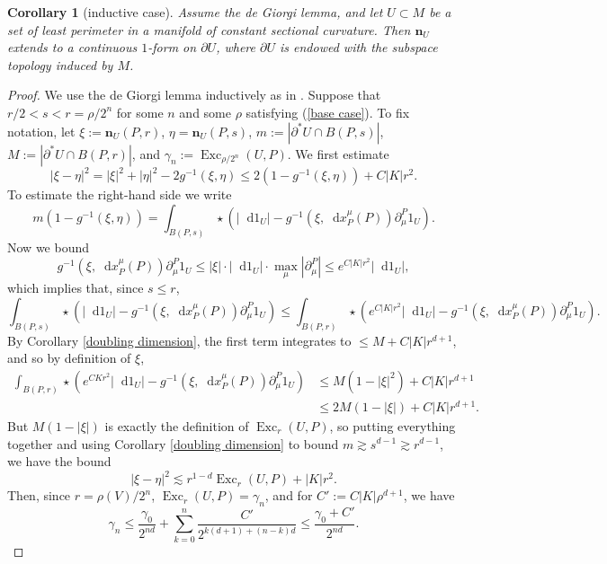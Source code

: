 \documentclass[reqno,11pt]{amsart}
\DeclareMathOperator{\Exc}{Exc}
\newcommand*\dif{\mathop{}\!\mathrm{d}}
\newcommand{\normal}{\mathbf n}
\newtheorem{corollary}[theorem]{Corollary}
\theoremstyle{definition}
\numberwithin{equation}{section}
\begin{document}
\begin{corollary}[inductive case]
Assume the de Giorgi lemma, and let $U \subset M$ be a set of least perimeter in a manifold of constant sectional curvature.
Then $\normal_U$ extends to a continuous $1$-form on $\partial U$, where $\partial U$ is endowed with the subspace topology induced by $M$.
\end{corollary}
\begin{proof}
We use the de Giorgi lemma inductively as in \cite[Theorem 8.2]{Giusti77}.
Suppose that $r/2 < s < r = \rho/2^n$ for some $n$ and some $\rho$ satisfying (\ref{base case}).
To fix notation, let
$\xi := \normal_U(P, r)$, $\eta = \normal_U(P, s)$, $m := |\partial^* U \cap B(P, s)|$, $M := |\partial^* U \cap B(P, r)|$, and $\gamma_n := \Exc_{\rho/2^n}(U, P)$.
We first estimate
$$|\xi - \eta|^2 = |\xi|^2 + |\eta|^2 - 2 g^{-1}(\xi, \eta) \leq 2(1 - g^{-1}(\xi, \eta)) + C|K|r^2.$$
To estimate the right-hand side we write
$$m(1 - g^{-1}(\xi, \eta)) = \int_{B(P, s)} \star(|\dif 1_U| - g^{-1}(\xi, \dif x^\mu_P(P)) \partial^P_\mu 1_U).$$
Now we bound
$$ g^{-1}(\xi, \dif x^\mu_P(P)) \partial^P_\mu 1_U \leq |\xi| \cdot |\dif 1_U| \cdot \max_\mu |\partial^P_\mu| \leq e^{C|K|r^2} |\dif 1_U|,$$
which implies that, since $s \leq r$,
$$\int_{B(P, s)} \star(|\dif 1_U| - g^{-1}(\xi, \dif x^\mu_P(P)) \partial^P_\mu 1_U) \leq \int_{B(P, r)} \star(e^{C|K|r^2} |\dif 1_U| - g^{-1}(\xi, \dif x^\mu_P(P)) \partial^P_\mu 1_U).$$
By Corollary \ref{doubling dimension}, the first term integrates to $\leq M + C|K|r^{d + 1}$, and so by definition of $\xi$,
\begin{align*}
\int_{B(P, r)} \star(e^{CKr^2} |\dif 1_U| - g^{-1}(\xi, \dif x^\mu_P(P)) \partial^P_\mu 1_U) &\leq M(1 - |\xi|^2) + C|K|r^{d + 1}\\
&\leq 2M(1 - |\xi|) + C|K|r^{d + 1}.
\end{align*}
But $M(1 - |\xi|)$ is exactly the definition of $\Exc_r(U, P)$, so putting everything together and using Corollary \ref{doubling dimension} to bound $m \gtrsim s^{d - 1} \gtrsim r^{d - 1}$, we have the bound
\begin{equation}\label{just need the excess}
|\xi - \eta|^2 \lesssim r^{1 - d} \Exc_r(U, P) + |K|r^2.
\end{equation}
Then, since $r = \rho(V)/2^n$, $\Exc_r(U, P) = \gamma_n$, and for $C' := C|K|\rho^{d + 1}$, we have
\begin{equation}\label{induction on gamma}
\gamma_n \leq \frac{\gamma_0}{2^{nd}} + \sum_{k=0}^n \frac{C'}{2^{k(d + 1) + (n - k)d}} \leq \frac{\gamma_0 + C'}{2^{nd}}.

\end{equation}
\end{proof}
\end{document}
